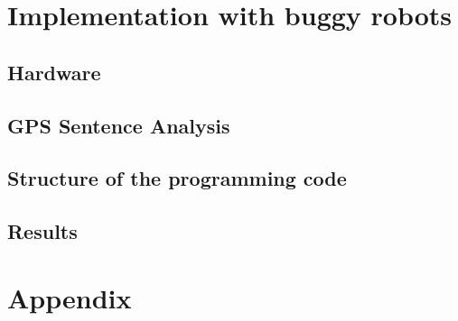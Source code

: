 \documentclass[12pt,fleqn]{report} %
\begin{document}
\chapter{Implementation with buggy robots}
\section{Hardware}

\section{GPS Sentence Analysis}

\section{Structure of the programming code}

\section{Results}


%

\appendix
\chapter*{Appendix}

%


\nocite{*}

\end{document}
